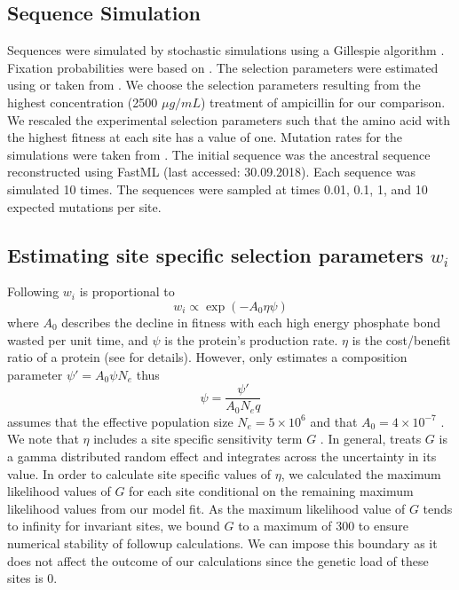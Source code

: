 \documentclass[fleqn,letterpaper]{article}
\begin{document}
\subsection{Sequence Simulation}

Sequences were simulated by stochastic simulations using a Gillespie algorithm \citep{gillespie1976}.
Fixation probabilities were based on \citet{SellaAndHirsh2005}.
The selection parameters were estimated using \selac or taken from \citet{stiffler2016}.
We choose the selection parameters resulting from the highest concentration (2500 $\mu g/mL$) treatment of ampicillin for our comparison.
We rescaled the experimental selection parameters such that the amino acid with the highest fitness at each site has a value of one.
Mutation rates for the simulations were taken from \selac.
The initial sequence was the ancestral sequence reconstructed using FastML \citep{fastml} (last accessed: 30.09.2018).
Each sequence was simulated 10 times. %
The sequences were sampled at times 0.01, 0.1, 1, and 10 expected mutations per site.

\subsection{Estimating site specific selection parameters $w_i$}

Following \citet{beaulieu2019} $w_i$ is proportional to
\begin{equation}
w_i \propto \exp(-A_0\eta\psi)
\end{equation}
where $A_0$ describes the decline in fitness with each high energy phosphate bond wasted per unit time, and $\psi$ is the protein's production rate.
$\eta$ is the cost/benefit ratio of a protein (see \citep{beaulieu2019} for details). 
However, \selac only estimates a composition parameter $\psi' = A_0\psi N_e$ thus
\begin{equation}
\psi = \frac{\psi'}{A_0N_eq}
\end{equation}
\selac assumes that the effective population size $N_e = 5\times 10^6$ and that $A_0 = 4 \times 10^{-7}$ \citep{gilchrist2007}.
We note that $\eta$ includes a site specific sensitivity term $G$ \citep{beaulieu2019}.
In general, \selac treats $G$ is a gamma distributed random effect and integrates across the uncertainty in its value.
In order to calculate site specific values of $\eta$, we calculated the maximum likelihood values of $G$ for each site conditional on the remaining maximum likelihood values from our \selac model fit.
As the maximum likelihood value of $G$ tends to infinity for invariant sites, we bound $G$ to a maximum of 300 to ensure numerical stability of followup calculations.
We can impose this boundary as it does not affect the outcome of our calculations since the genetic load of these sites is 0.
\end{document}
